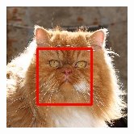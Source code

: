 \documentclass[conference,compsoc]{IEEEtran}
\begin{document}
\begin{figure}
	\begin{multicols}{4}
    		\includegraphics[height=1.3\linewidth]{goodFace2.jpg}\par 

\end{multicols}
\end{figure}
\end{document}
